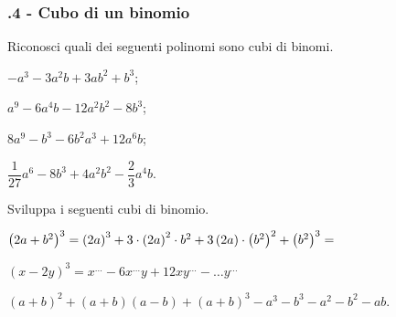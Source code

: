 \subsubsection*{\thechapter.4 - Cubo di un binomio}

\begin{esercizio}
 \label{ese:12.24}
Riconosci quali dei seguenti polinomi sono cubi di binomi.
\begin{multicols}{2}
\begin{enumeratea}
 \item $-a^{3}-3a^{2}b+3{ab}^{2}+b^{3}$; %
 \item $a^{9}-6a^{4}b-12a^{2}b^{2}-8b^{3}$; %
 \item $8a^{9}-b^{3}-6b^{2}a^{3}+12a^{6}b$; %
 \item $\dfrac{1}{27}a^{6}-8b^{3}+4a^{2}b^{2}-\dfrac{2}{3}a^{4}b$. %
\end{enumeratea}
\end{multicols}
\end{esercizio}

\begin{esercizio}
 \label{ese:12.25}
 Sviluppa i seguenti cubi di binomio.

 \begin{enumeratea}
\item $ \left(2a+b^{2}\right)^{3}=\left(2a\right)^{3}+3\cdot\left(2a\right)^{2}\cdot b^{2}+3\left(2a\right)\cdot\left(b^{2}\right)^{2}+\left(b^{2}\right)^{3}=\dotfill~$
\item $\left(x-2y\right)^{3}=x^{\ldots }-6x^{\ldots }y+12{xy}^{\ldots}-\ldots y^{\ldots }$
\item $(a+b)^{2}+(a+b)(a-b)+(a+b)^{3}-a^{3}-b^{3}-a^{2}-b^{2}-{ab}$.
\end{enumeratea}
\end{esercizio}


